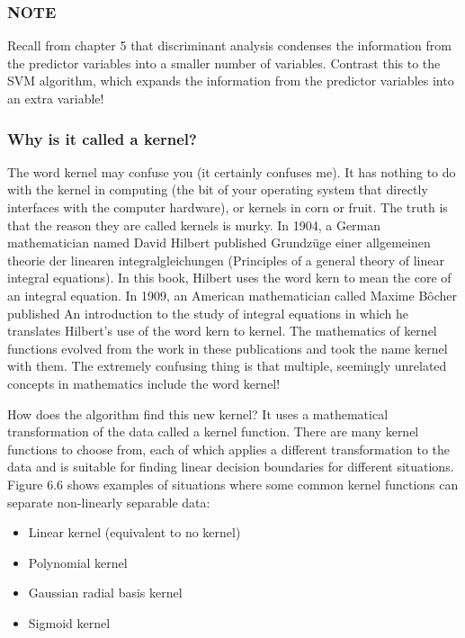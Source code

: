 \documentclass[
]{article}
\providecommand{\tightlist}{%
  \setlength{\itemsep}{0pt}\setlength{\parskip}{0pt}}
\begin{document}
\subsubsection{NOTE}\label{note-12}

Recall from chapter 5 that discriminant analysis condenses the
information from the predictor variables into a smaller number of
variables. Contrast this to the SVM algorithm, which expands the
information from the predictor variables into an extra variable!

\subsubsection{Why is it called a
kernel?}\label{why-is-it-called-a-kernel}

The word kernel may confuse you (it certainly confuses me). It has
nothing to do with the kernel in computing (the bit of your operating
system that directly interfaces with the computer hardware), or kernels
in corn or fruit. The truth is that the reason they are called kernels
is murky. In 1904, a German mathematician named David Hilbert published
Grundzüge einer allgemeinen theorie der linearen integralgleichungen
(Principles of a general theory of linear integral equations). In this
book, Hilbert uses the word kern to mean the core of an integral
equation. In 1909, an American mathematician called Maxime Bôcher
published An introduction to the study of integral equations in which he
translates Hilbert's use of the word kern to kernel. The mathematics of
kernel functions evolved from the work in these publications and took
the name kernel with them. The extremely confusing thing is that
multiple, seemingly unrelated concepts in mathematics include the word
kernel!

How does the algorithm find this new kernel? It uses a mathematical
transformation of the data called a kernel function. There are many
kernel functions to choose from, each of which applies a different
transformation to the data and is suitable for finding linear decision
boundaries for different situations. Figure 6.6 shows examples of
situations where some common kernel functions can separate non-linearly
separable data:

\begin{itemize}
\tightlist
\item
  Linear kernel (equivalent to no kernel)
\item
  Polynomial kernel
\item
  Gaussian radial basis kernel
\item
  Sigmoid kernel
\end{itemize}
\end{document}
